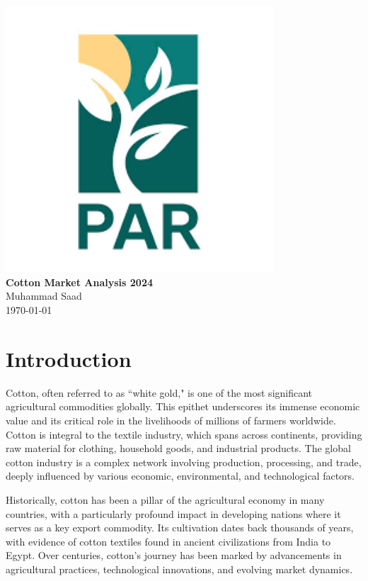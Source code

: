 \documentclass[12pt]{article}
\begin{document}
\begin{titlepage}
    \centering
    \vspace*{\fill} %
    \includegraphics[width=10cm]{img/logo2.png}\\[1cm] %
    {\Large \textbf{Cotton Market Analysis 2024}}\\[0.5cm]
    {\large Muhammad Saad}\\[0.2cm]
    {\large \today}\\[0.5cm]
    \vspace*{\fill}
\end{titlepage}

\newpage
\tableofcontents
\newpage

\section{Introduction}
Cotton, often referred to as ``white gold," is one of the most significant agricultural commodities globally. This epithet underscores its immense economic value and its critical role in the livelihoods of millions of farmers worldwide. Cotton is integral to the textile industry, which spans across continents, providing raw material for clothing, household goods, and industrial products. The global cotton industry is a complex network involving production, processing, and trade, deeply influenced by various economic, environmental, and technological factors.

Historically, cotton has been a pillar of the agricultural economy in many countries, with a particularly profound impact in developing nations where it serves as a key export commodity. Its cultivation dates back thousands of years, with evidence of cotton textiles found in ancient civilizations from India to Egypt. Over centuries, cotton's journey has been marked by advancements in agricultural practices, technological innovations, and evolving market dynamics.
\end{document}
